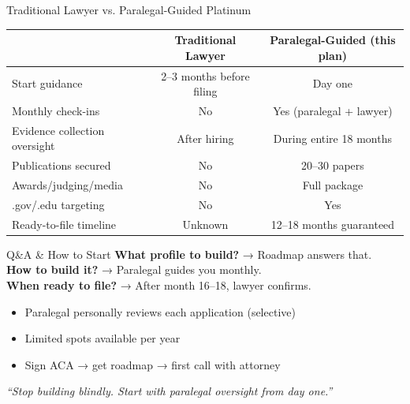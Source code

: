 \documentclass[aspectratio=169, 10pt]{beamer}
\begin{document}
	\begin{frame}{Traditional Lawyer vs. Paralegal-Guided Platinum}
		\begin{table}
			\centering
			\scriptsize
			\begin{tabular}{lcc}
				\toprule
				& \textbf{Traditional Lawyer} & \textbf{Paralegal-Guided (this plan)} \\
				\midrule
				Start guidance & 2–3 months before filing & Day one \\
				Monthly check-ins & No & Yes (paralegal + lawyer) \\
				Evidence collection oversight & After hiring & During entire 18 months \\
				Publications secured & No & 20–30 papers \\
				Awards/judging/media & No & Full package \\
				.gov/.edu targeting & No & Yes \\
				Ready-to-file timeline & Unknown & 12–18 months guaranteed \\
				\bottomrule
			\end{tabular}
		\end{table}
	\end{frame}
	
	\begin{frame}{Q\&A \& How to Start}
		\centering
		\textbf{\Large What profile to build?} → Roadmap answers that. \\
		\textbf{\Large How to build it?} → Paralegal guides you monthly. \\
		\textbf{\Large When ready to file?} → After month 16–18, lawyer confirms.
		
		\vspace{0.5cm}
		\begin{itemize}
			\item Paralegal personally reviews each application (selective)
			\item Limited spots available per year
			\item Sign ACA → get roadmap → first call with attorney
		\end{itemize}
		
		\vspace{0.3cm}
		\textit{“Stop building blindly. Start with paralegal oversight from day one.”}
	\end{frame}
	
\end{document}
